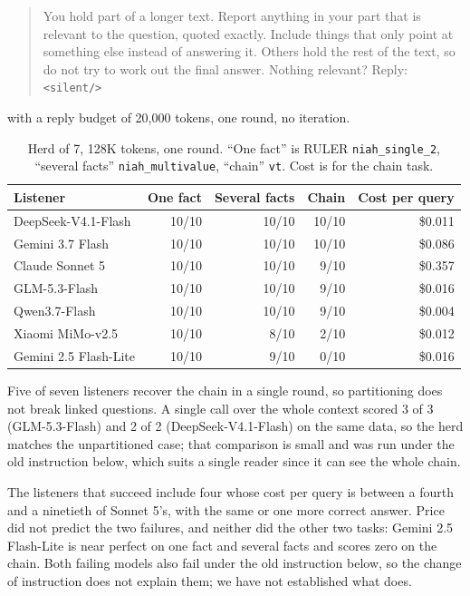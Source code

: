\documentclass[11pt]{article}
\begin{document}
\begin{quote}\small
You hold part of a longer text. Report anything in your part that is relevant to the
question, quoted exactly. Include things that only point at something else instead of
answering it. Others hold the rest of the text, so do not try to work out the final
answer. Nothing relevant? Reply: \texttt{<silent/>}
\end{quote}

\noindent with a reply budget of 20{,}000 tokens, one round, no iteration.

\begin{table}[h]
\centering
\begin{tabular}{lrrrr}
\toprule
Listener & One fact & Several facts & Chain & Cost per query \\
\midrule
DeepSeek-V4.1-Flash   & 10/10 & 10/10 & 10/10 & \$0.011 \\
Gemini 3.7 Flash      & 10/10 & 10/10 & 10/10 & \$0.086 \\
Claude Sonnet 5       & 10/10 & 10/10 &  9/10 & \$0.357 \\
GLM-5.3-Flash         & 10/10 & 10/10 &  9/10 & \$0.016 \\
Qwen3.7-Flash         & 10/10 & 10/10 &  9/10 & \$0.004 \\
Xiaomi MiMo-v2.5      & 10/10 &  8/10 &  2/10 & \$0.012 \\
Gemini 2.5 Flash-Lite & 10/10 &  9/10 &  0/10 & \$0.016 \\
\bottomrule
\end{tabular}
\caption{Herd of 7, 128K tokens, one round. ``One fact'' is RULER
\texttt{niah\_single\_2}, ``several facts'' \texttt{niah\_multivalue}, ``chain''
\texttt{vt}. Cost is for the chain task.}
\end{table}

Five of seven listeners recover the chain in a single round, so partitioning does not
break linked questions. A single call over the whole context scored 3 of 3 (GLM-5.3-Flash) and 2 of 2
(DeepSeek-V4.1-Flash) on the same data, so the herd matches the unpartitioned case;
that comparison is small and was run under the old instruction below, which suits a
single reader since it can see the whole chain.

The listeners that succeed include four whose cost per query is between a fourth and a
ninetieth of Sonnet 5's, with the same or one more correct answer. Price did not predict
the two failures, and neither did the other two tasks: Gemini 2.5 Flash-Lite is near
perfect on one fact and several facts and scores zero on the chain. Both failing models
also fail under the old instruction below, so the change of instruction does not
explain them; we have not established what does.
\end{document}
